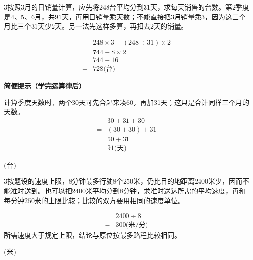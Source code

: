 \documentclass[multi=snippet,border={5bp 20bp 5bp 5bp}]{standalone}
\newenvironment{snippet}[3]{\begin{minipage}{#1bp}\color{answerred}\fontsize{#2}{#3}\selectfont\raggedright}{\end{minipage}}
\begin{document}
\begin{snippet}{505}{11.5}{14}\begin{multicols}{3}\raggedcolumns 按照\(3\)\allowbreak 月的日销量计算，应先将\(248\)\allowbreak 台平均分到\(31\)\allowbreak 天，求每天销售的台数。第\(2\)\allowbreak 季度是\(4\)\allowbreak 、\(5\)\allowbreak 、\(6\)\allowbreak 月，共\(91\)\allowbreak 天，再用日销量乘天数；不能直接把\(3\)\allowbreak 月销量乘\(3\)\allowbreak ，因为这三个月比三个\(31\)\allowbreak 天少\(2\)\allowbreak 天。另一法先这样多算，再扣去\(2\)\allowbreak 天的销量。\par \[\begin{aligned}&248\times3-(248\div31)\times2\\={}&744-8\times2\\={}&744-16\\={}&728\text{(台)}\end{aligned}\]\par\textbf{简便提示（学完运算律后）}\par 计算季度天数时，两个30天可先合起来凑60，再加31天；这只是合计同样三个月的天数。\[\begin{aligned}&30+31+30\\={}&(30+30)+31\\={}&60+31\\={}&91\text{(天)}\end{aligned}\]\end{multicols}\end{snippet}
\begin{snippet}{80}{10.0}{14}\SourceSans\setlength{\mathindent}{2bp}\(\text{(台)}\)\end{snippet}
\begin{snippet}{505}{11.5}{14}\begin{multicols}{3}\raggedcolumns 按题设的速度上限，\(8\)\allowbreak 分钟最多行驶\(8\)\allowbreak 个\(250\)\allowbreak 米，仍比目的地距离\(2400\)\allowbreak 米少，因而不能准时送到。也可以把\(2400\)\allowbreak 米平均分到\(8\)\allowbreak 分钟，求准时送达所需的平均速度，再和每分钟\(250\)\allowbreak 米的上限比较；比较的双方要用相同的速度单位。\par \[\begin{aligned}&2400\div8\\={}&300\text{(米/分)}\end{aligned}\]所需速度大于规定上限，结论与原位按最多路程比较相同。\end{multicols}\end{snippet}
\begin{snippet}{80}{10.0}{14}\SourceSans\setlength{\mathindent}{2bp}\(\text{(米)}\)\end{snippet}
\end{document}
